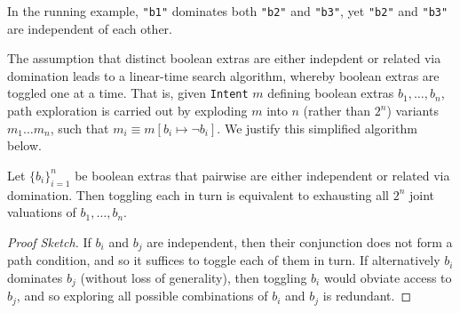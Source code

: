 In the running example, {\tt "b1"} dominates both {\tt "b2"} and {\tt "b3"}, yet {\tt "b2"} and {\tt "b3"} are independent of each other.

The assumption that distinct boolean extras are either indepdent or related via domination leads to a linear-time search algorithm, whereby boolean extras are toggled one at a time. That is, given {\tt Intent}  $m$ defining boolean extras $b_1,\ldots,b_n$, path exploration is carried out by exploding $m$ into $n$ (rather than $2^n$) variants $m_1 \ldots m_n$, such that $m_i \equiv m[ b_i \mapsto \neg b_i ]$. We justify this simplified algorithm below.

\begin{lemma} Let $\{ b_i \}_{i=1}^n$ be boolean extras that pairwise are either independent or related via domination. Then toggling each in turn is equivalent to exhausting all $2^n$ joint valuations of $b_1,\ldots,b_n$.
\begin{proof}[Proof Sketch]
If $b_i$ and $b_j$ are independent, then their conjunction does not form a path condition, and so it suffices to toggle each of them in turn. If alternatively $b_i$ dominates $b_j$ (without loss of generality), then toggling $b_i$ would obviate access to $b_j$, and so exploring all possible combinations of $b_i$ and $b_j$ is redundant.
\end{proof}
\end{lemma}




